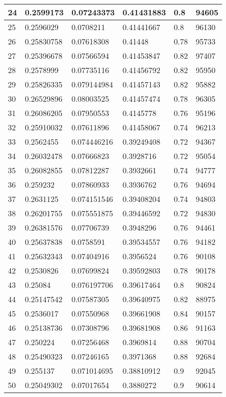 \begin{longtable}{|l|l|l|l|l|l|}
24 & 0.2599173 & 0.07243373 & 0.41431883 & 0.8 & 94605 \\ \hline 
25 & 0.2596029 & 0.0708211 & 0.41441667 & 0.8 & 96130 \\ \hline 
26 & 0.25830758 & 0.07618308 & 0.41448 & 0.78 & 95733 \\ \hline 
27 & 0.25396678 & 0.07566594 & 0.41453847 & 0.82 & 97407 \\ \hline 
28 & 0.2578999 & 0.07735116 & 0.41456792 & 0.82 & 95950 \\ \hline 
29 & 0.25826335 & 0.079144984 & 0.41457143 & 0.82 & 95882 \\ \hline 
30 & 0.26529896 & 0.08003525 & 0.41457474 & 0.78 & 96305 \\ \hline 
31 & 0.26086205 & 0.07950553 & 0.4145778 & 0.76 & 95196 \\ \hline 
32 & 0.25910032 & 0.07611896 & 0.41458067 & 0.74 & 96213 \\ \hline 
33 & 0.2562455 & 0.074446216 & 0.39249408 & 0.72 & 94367 \\ \hline 
34 & 0.26032478 & 0.07666823 & 0.3928716 & 0.72 & 95054 \\ \hline 
35 & 0.26082855 & 0.07812287 & 0.3932661 & 0.74 & 94777 \\ \hline 
36 & 0.259232 & 0.07860933 & 0.3936762 & 0.76 & 94694 \\ \hline 
37 & 0.2631125 & 0.074151546 & 0.39408204 & 0.74 & 94803 \\ \hline 
38 & 0.26201755 & 0.075551875 & 0.39446592 & 0.72 & 94830 \\ \hline 
39 & 0.26381576 & 0.07706739 & 0.3948296 & 0.76 & 94461 \\ \hline 
40 & 0.25637838 & 0.0758591 & 0.39534557 & 0.76 & 94182 \\ \hline 
41 & 0.25632343 & 0.07404916 & 0.3956524 & 0.76 & 90108 \\ \hline 
42 & 0.2530826 & 0.07699824 & 0.39592803 & 0.78 & 90178 \\ \hline 
43 & 0.25084 & 0.076197706 & 0.39617464 & 0.8 & 90824 \\ \hline 
44 & 0.25147542 & 0.07587305 & 0.39640975 & 0.82 & 88975 \\ \hline 
45 & 0.2536017 & 0.07550968 & 0.39661908 & 0.84 & 90157 \\ \hline 
46 & 0.25138736 & 0.07308796 & 0.39681908 & 0.86 & 91163 \\ \hline 
47 & 0.250224 & 0.07256468 & 0.3969814 & 0.88 & 90704 \\ \hline 
48 & 0.25490323 & 0.07246165 & 0.3971368 & 0.88 & 92684 \\ \hline 
49 & 0.255137 & 0.071014695 & 0.38810912 & 0.9 & 92045 \\ \hline 
50 & 0.25049302 & 0.07017654 & 0.3880272 & 0.9 & 90614 \\ \hline 
\end{longtable}